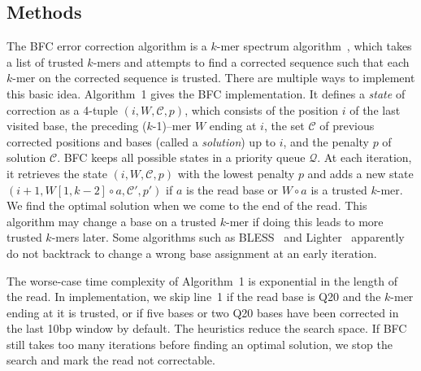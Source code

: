 \documentclass{bioinfo}
\begin{document}
\begin{methods}
\section{Methods}
The BFC error correction algorithm is a $k$-mer spectrum
algorithm~\citep{Pevzner:2001vn}, which takes a list of trusted $k$-mers and
attempts to find a corrected sequence such that each $k$-mer on the corrected
sequence is trusted. There are multiple ways to implement this basic idea.
Algorithm~1 gives the BFC implementation. It defines a \emph{state} of
correction as a 4-tuple $(i,W,\mathcal{C},p)$, which consists of the position
$i$ of the last visited base, the preceding \mbox{($k$-1)--mer} $W$ ending at
$i$, the set $\mathcal{C}$ of previous corrected positions and bases (called a
\emph{solution}) up to $i$, and the penalty $p$ of solution $\mathcal{C}$.  BFC
keeps all possible states in a priority queue $\mathcal{Q}$. At each iteration,
it retrieves the state $(i,W,\mathcal{C},p)$ with the lowest penalty $p$ and
adds a new state $(i+1,W[1,k-2]\circ a,\mathcal{C}',p')$ if $a$ is the read
base or $W\circ a$ is a trusted $k$-mer. We find the optimal solution when we
come to the end of the read. This algorithm may change a base on a trusted
$k$-mer if doing this leads to more trusted $k$-mers later. Some algorithms
such as BLESS~\citep{Heo:2014aa} and Lighter~\citep{Song:2014aa} apparently do
not backtrack to change a wrong base assignment at an early iteration.

The worse-case time complexity of Algorithm~1 is exponential in the length of
the read. In implementation, we skip line~1 if the read base is Q20 and the
$k$-mer ending at it is trusted, or if five bases or two Q20 bases have been
corrected in the last 10bp window by default. The heuristics reduce the
search space. If BFC still takes too many iterations before finding an optimal
solution, we stop the search and mark the read not correctable.


\end{methods}
\end{document}

